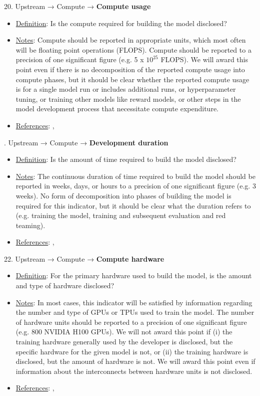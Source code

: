 20. Upstream → Compute → \textbf{Compute usage}
\vspace{-\parskip}
\begin{itemize}
\item
\underline{Definition}: Is the compute required for building the model disclosed?
\item
\underline{Notes}: Compute should be reported in appropriate units, which most often will be floating point operations (FLOPS). Compute should be reported to a precision of one significant figure (e.g. 5 x $10^{25}$ FLOPS). We will award this point even if there is no decomposition of the reported compute usage into compute phases, but it should be clear whether the reported compute usage is for a single model run or includes additional runs, or hyperparameter tuning, or training other models like reward models, or other steps in the model development process that necessitate compute expenditure.
\item
\underline{References}: \citet{henderson2020towards}, \citet{strubell2019energy}
\end{itemize}


. Upstream → Compute → \textbf{Development duration}
\vspace{-\parskip}
\begin{itemize}
\item
\underline{Definition}: Is the amount of time required to build the model disclosed?
\item
\underline{Notes}: The continuous duration of time required to build the model should be reported in weeks, days, or hours to a precision of one significant figure (e.g. 3 weeks). No form of decomposition into phases of building the model is required for this indicator, but it should be clear what the duration refers to (e.g. training the model, training and subsequent evaluation and red teaming).
\item
\underline{References}: \citet{sevilla2022compute}, \citet{hoffmann2022training}
\end{itemize}


22. Upstream → Compute → \textbf{Compute hardware}
\vspace{-\parskip}
\begin{itemize}
\item
\underline{Definition}: For the primary hardware used to build the model, is the amount and type of hardware disclosed?
\item
\underline{Notes}: In most cases, this indicator will be satisfied by information regarding the number and type of GPUs or TPUs used to train the model. The number of hardware units should be reported to a precision of one significant figure (e.g. 800 NVIDIA H100 GPUs). We will not award this point if (i) the training hardware generally used by the developer is disclosed, but the specific hardware for the given model is not, or (ii) the training hardware is disclosed, but the amount of hardware is not. We will award this point even if information about the interconnects between hardware units is not disclosed.
\item
\underline{References}: \citet{sevilla2022compute}, \citet{hoffmann2022training}
\end{itemize}



